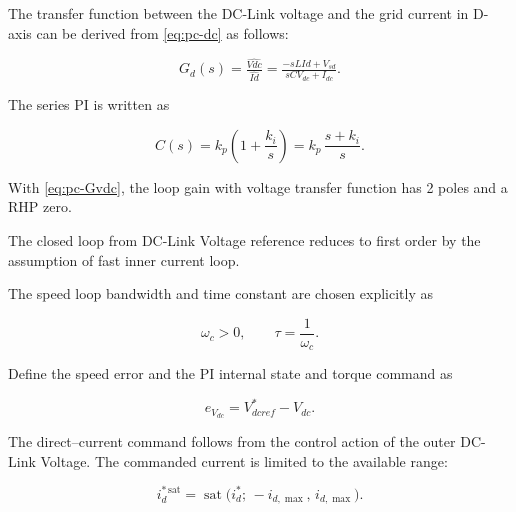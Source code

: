 The transfer function between the DC-Link voltage and the grid current in D-axis can be derived from \eqref{eq:pc-dc} as follows:

\begin{equation}
	\label{eq:pc-Gvdc}
	G_{d}(s) = \tfrac{\hat{Vdc}}{\hat{Id}} = \tfrac{-sLId+V_{sd}}{sCV_{dc}+I_{dc}}.
\end{equation}



The series PI is written as

\begin{equation}
	\label{eq:pc-controller}
	C(s) = k_p\!\left(1 + \frac{k_i}{s}\right) = k_p\,\frac{s + k_i}{s} .
\end{equation}



With \eqref{eq:pc-Gvdc}, the loop gain with voltage transfer function has 2 poles and a RHP zero. 



The closed loop from DC-Link Voltage reference reduces to first order by the assumption of fast inner current loop.



The speed loop bandwidth and time constant are chosen explicitly as

\begin{equation}
	\label{eq:pc-wc}
	\omega_c > 0 , \qquad \tau = \frac{1}{\omega_c} .
\end{equation}



Define the speed error and the PI internal state and torque command as

\begin{equation}
	\label{eq:pc-realize}
	e_{V_{dc}} = V_{dcref}^{*} - V_{dc}.
\end{equation}

The direct–current command follows from the control action of the outer DC-Link Voltage. The commanded current is limited to the available range:



\begin{equation}
	\label{eq:pc-sat}
	i_d^{\ast\,\mathrm{sat}} = \operatorname{sat}\!\big(i_d^{\ast};\, -i_{d,\max},\, i_{d,\max}\big).
\end{equation}



